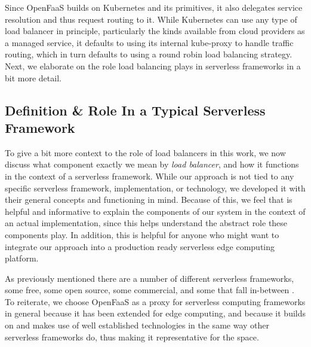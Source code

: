 Since OpenFaaS\cite{openfaas} builds on Kubernetes and its primitives, it also delegates service resolution and thus request routing to it.
While Kubernetes can use any type of load balancer in principle, particularly the kinds available from cloud providers as a managed service, it defaults to using its internal kube-proxy to handle traffic routing, which in turn defaults to using a round robin load balancing strategy.
Next, we elaborate on the role load balancing plays in serverless frameworks in a bit more detail.


\subsection{ Definition \& Role In a Typical Serverless Framework}
To give a bit more context to the role of load balancers in this work, we now discuss what component exactly we mean by \textit{load balancer}, and how it functions in the context of a serverless framework. While our approach is not tied to any specific serverless framework, implementation, or technology, we developed it with their general concepts and functioning in mind. Because of this, we feel that is helpful and informative to explain the components of our system in the context of an actual implementation, since this helps understand the abstract role these components play. In addition, this is helpful for anyone who might want to integrate our approach into a production ready serverless edge computing platform.

As previously mentioned there are a number of different serverless frameworks, some free, some open source, some commercial, and some that fall in-between\cite{aws-lambda}\cite{azure-functions} \cite{openfaas-gateway}\cite{kubeless}\cite{openwhisk}.
To reiterate, we choose OpenFaaS as a proxy for serverless computing frameworks in general because it has been extended for edge computing, and because it builds on and makes use of well established technologies in the same way other serverless frameworks do\cite{kubeless}\cite{openwhisk}, thus making it representative for the space.


